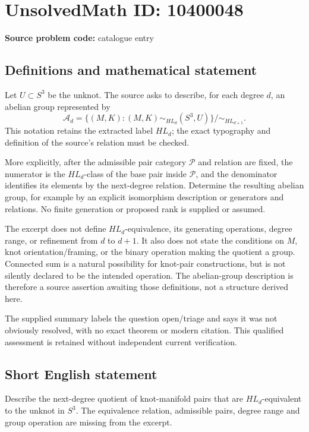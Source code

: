 \documentclass[11pt]{article}
\begin{document}
\section*{UnsolvedMath ID: 10400048}
\textbf{Source problem code:} catalogue entry
\subsection{Definitions and mathematical statement}
Let \(U\subset S^3\) be the unknot. The source asks to describe, for each degree \(d\), an abelian group represented by
\[
 \mathcal A_d=
 \{(M,K):(M,K)\sim_{HL_d}(S^3,U)\}\big/\sim_{HL_{d+1}}.
\]
This notation retains the extracted label \(HL_d\); the exact typography and definition of the source's relation must be checked.

More explicitly, after the admissible pair category \(\mathcal P\) and relation are fixed, the numerator is the \(HL_d\)-class of the base pair inside \(\mathcal P\), and the denominator identifies its elements by the next-degree relation. Determine the resulting abelian group, for example by an explicit isomorphism description or generators and relations. No finite generation or proposed rank is supplied or assumed.

The excerpt does not define \(HL_d\)-equivalence, its generating operations, degree range, or refinement from \(d\) to \(d+1\). It also does not state the conditions on \(M\), knot orientation/framing, or the binary operation making the quotient a group. Connected sum is a natural possibility for knot-pair constructions, but is not silently declared to be the intended operation. The abelian-group description is therefore a source assertion awaiting those definitions, not a structure derived here.

The supplied summary labels the question open/triage and says it was not obviously resolved, with no exact theorem or modern citation. This qualified assessment is retained without independent current verification.
\subsection{Short English statement}
Describe the next-degree quotient of knot-manifold pairs that are \(HL_d\)-equivalent to the unknot in \(S^3\). The equivalence relation, admissible pairs, degree range and group operation are missing from the excerpt.
\end{document}
